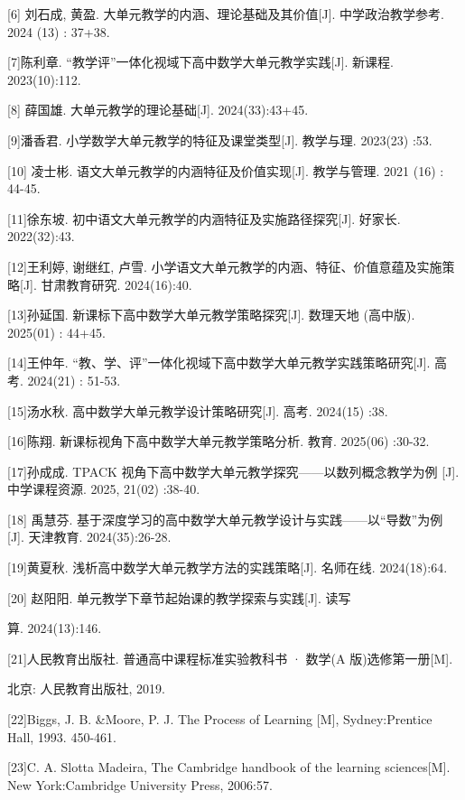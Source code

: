 \documentclass[10pt]{article}
\begin{document}
[6] 刘石成, 黄盈. 大单元教学的内涵、理论基础及其价值[J]. 中学政治教学参考. 2024 (13) : 37+38.

[7]陈利章. “教学评”一体化视域下高中数学大单元教学实践[J]. 新课程. 2023(10):112.

[8] 薛国雄. 大单元教学的理论基础[J]. 2024(33):43+45.

[9]潘香君. 小学数学大单元教学的特征及课堂类型[J]. 教学与理. 2023(23) :53.

[10] 凌士彬. 语文大单元教学的内涵特征及价值实现[J]. 教学与管理. 2021 (16) : 44-45.

[11]徐东坡. 初中语文大单元教学的内涵特征及实施路径探究[J]. 好家长. 2022(32):43.

[12]王利婷, 谢继红, 卢雪. 小学语文大单元教学的内涵、特征、价值意蕴及实施策略[J]. 甘肃教育研究. 2024(16):40.

[13]孙延国. 新课标下高中数学大单元教学策略探究[J]. 数理天地 (高中版). 2025(01) : 44+45.

[14]王仲年. “教、学、评”一体化视域下高中数学大单元教学实践策略研究[J]. 高考. 2024(21) : 51-53.

[15]汤水秋. 高中数学大单元教学设计策略研究[J]. 高考. 2024(15) :38.

[16]陈翔. 新课标视角下高中数学大单元教学策略分析. 教育. 2025(06) :30-32.

[17]孙成成. TPACK 视角下高中数学大单元教学探究——以数列概念教学为例 [J]. 中学课程资源. 2025, 21(02) :38-40.

[18] 禹慧芬. 基于深度学习的高中数学大单元教学设计与实践——以“导数”为例 [J]. 天津教育. 2024(35):26-28.

[19]黄夏秋. 浅析高中数学大单元教学方法的实践策略[J]. 名师在线. 2024(18):64.

[20] 赵阳阳. 单元教学下章节起始课的教学探索与实践[J]. 读写

算. 2024(13):146.

[21]人民教育出版社. 普通高中课程标准实验教科书 · 数学(A 版)选修第一册[M].

北京: 人民教育出版社, 2019.

[22]Biggs, J. B. \&Moore, P. J. The Process of Learning [M], Sydney:Prentice Hall, 1993. 450-461.

[23]C. A. Slotta Madeira, The Cambridge handbook of the learning sciences[M]. New York:Cambridge University Press, 2006:57.
\end{document}
